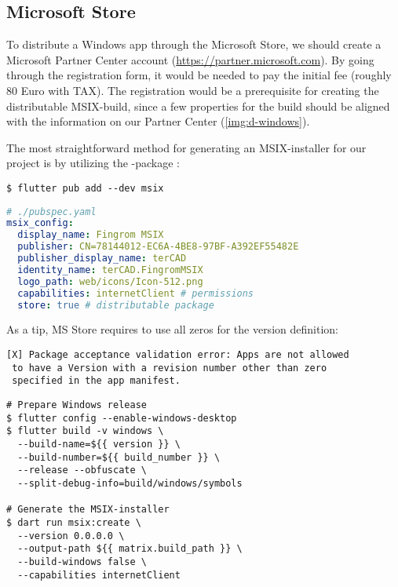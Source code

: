 
\subsection{Microsoft Store}

To distribute a Windows app through the Microsoft Store, we should create a Microsoft Partner Center account
(\href{https://partner.microsoft.com}{https://partner.microsoft.com}). By going through the registration form, it 
would be needed to pay the initial fee (roughly 80 Euro with TAX). The registration would be a prerequisite for 
creating the distributable MSIX-build, since a few properties for the build should be aligned with the information on 
our Partner Center (\cref{img:d-windows}). 

The most straightforward method for generating an MSIX-installer for our project is by utilizing the 
-package :

\begin{lstlisting}[language=terminal]
$ flutter pub add --dev msix
\end{lstlisting}

\begin{lstlisting}[language=yaml]
# ./pubspec.yaml
msix_config:
  display_name: Fingrom MSIX
  publisher: CN=78144012-EC6A-4BE8-97BF-A392EF55482E
  publisher_display_name: terCAD
  identity_name: terCAD.FingromMSIX
  logo_path: web/icons/Icon-512.png
  capabilities: internetClient # permissions
  store: true # distributable package
\end{lstlisting}


\noindent As a tip, MS Store requires to use all zeros for the version definition:

\begin{lstlisting}[language=terminal]
[X] Package acceptance validation error: Apps are not allowed
 to have a Version with a revision number other than zero 
 specified in the app manifest.
\end{lstlisting}

\begin{lstlisting}[language=terminal]
# Prepare Windows release
$ flutter config --enable-windows-desktop
$ flutter build -v windows \
  --build-name=${{ version }} \
  --build-number=${{ build_number }} \
  --release --obfuscate \
  --split-debug-info=build/windows/symbols

# Generate the MSIX-installer
$ dart run msix:create \
  --version 0.0.0.0	\
  --output-path ${{ matrix.build_path }} \
  --build-windows false \
  --capabilities internetClient
\end{lstlisting}


